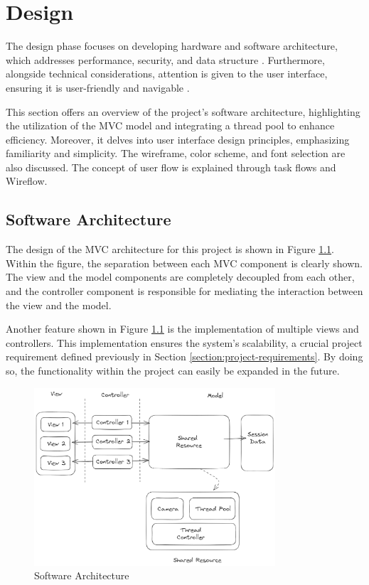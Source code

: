 \chapter{Design}
\label{chapter:design}

The design phase focuses on developing hardware and software architecture, which addresses performance, security, and data structure \cite{Hausen}. Furthermore, alongside technical considerations, attention is given to the user interface, ensuring it is user-friendly and navigable \cite{Hausen}.

This section offers an overview of the project's software architecture, highlighting the utilization of the MVC model and integrating a thread pool to enhance efficiency. Moreover, it delves into user interface design principles, emphasizing familiarity and simplicity. The wireframe, color scheme, and font selection are also discussed. The concept of user flow is explained through task flows and Wireflow.

\section{Software Architecture}
\label{sec:software-architecture}

The design of the MVC architecture for this project is shown in Figure \ref{fig:architechture}. Within the figure, the separation between each MVC component is clearly shown. The view and the model components are completely decoupled from each other, and the controller component is responsible for mediating the interaction between the view and the model.

Another feature shown in Figure \ref{fig:architechture} is the implementation of multiple views and controllers. This implementation ensures the system's scalability, a crucial project requirement defined previously in Section \ref{section:project-requirements}. By doing so, the functionality within the project can easily be expanded in the future.

\begin{figure}[!ht]
    \centering
    \includegraphics[width=0.8\textwidth]{texs/Part2/chapter3/image/architecture.png}
    \caption{Software Architecture}
    \label{fig:architechture}
\end{figure}

